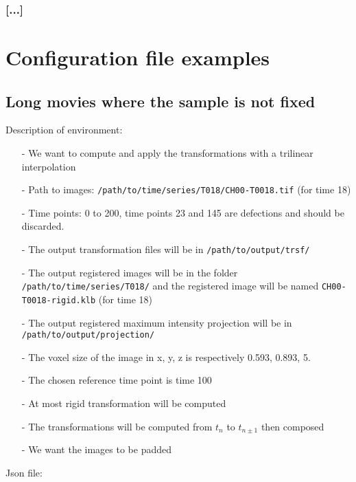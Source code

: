 \documentclass[10pt,a4paper]{book}
\begin{document}
\subsubsection{[...]}
\section{Configuration file examples}
\subsection{Long movies where the sample is not fixed}
Description of environment:
\begin{itemize}
\item[-] We want to compute and apply the transformations with a trilinear interpolation
\item[-] Path to images: \texttt{/path/to/time/series/T018/CH00-T0018.tif} (for time 18)
\item[-] Time points: 0 to 200, time points 23 and 145 are defections and should be discarded.
\item[-] The output transformation files will be in \texttt{/path/to/output/trsf/}
\item[-] The output registered images will be in the folder \texttt{/path/to/time/series/T018/} and the registered image will be named \texttt{CH00-T0018-rigid.klb} (for time 18)
\item[-] The output registered maximum intensity projection will be in \texttt{/path/to/output/projection/}
\item[-] The voxel size of the image in x, y, z is respectively 0.593, 0.893, 5.
\item[-] The chosen reference time point is time 100
\item[-] At most rigid transformation will be computed
\item[-] The transformations will be computed from $t_n$ to $t_{n\pm 1}$ then composed
\item[-] We want the images to be padded
\end{itemize}
Json file:
\end{document}
